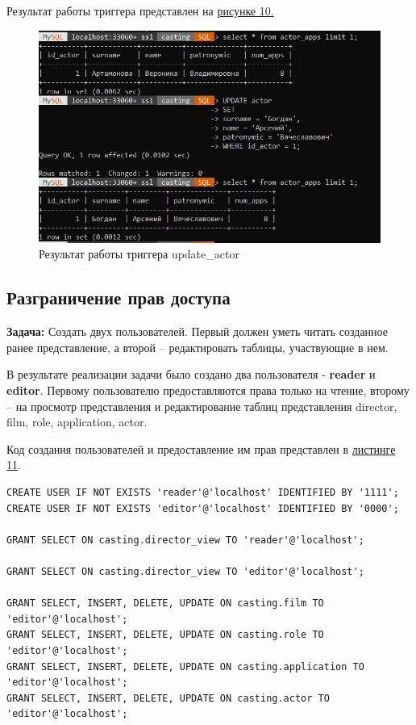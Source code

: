 \documentclass[11pt,a4paper,final]{article} %
\begin{document}
Результат работы триггера представлен на \hyperref[fig:pic10]{рисунке 10.}

\begin{figure}[H]
	\centering
	\includegraphics[width=0.9\linewidth]{pic10.png}
	\caption{Результат работы триггера update\_actor}
	\label{fig:pic10}
\end{figure}


\subsection{Разграничение прав доступа}

\textbf{Задача:} Создать двух пользователей. Первый должен уметь читать созданное ранее представление, а второй -- редактировать таблицы, участвующие в нем.

\par В результате реализации задачи было создано два пользователя - \textbf{reader} и \textbf{editor}. Первому пользователю предоставляются права только на чтение, второму -- на просмотр представления и редактирование таблиц представления director, film, role, application, actor.

Код создания пользователей и предоставление им прав представлен в \hyperref[lst:l11]{листинге 11}.

\begin{lstlisting}[caption={Код создания пользователей и назначения им прав}, label=lst:l11]
CREATE USER IF NOT EXISTS 'reader'@'localhost' IDENTIFIED BY '1111';
CREATE USER IF NOT EXISTS 'editor'@'localhost' IDENTIFIED BY '0000';

GRANT SELECT ON casting.director_view TO 'reader'@'localhost';

GRANT SELECT ON casting.director_view TO 'editor'@'localhost';

GRANT SELECT, INSERT, DELETE, UPDATE ON casting.film TO 'editor'@'localhost';
GRANT SELECT, INSERT, DELETE, UPDATE ON casting.role TO 'editor'@'localhost';
GRANT SELECT, INSERT, DELETE, UPDATE ON casting.application TO 'editor'@'localhost';
GRANT SELECT, INSERT, DELETE, UPDATE ON casting.actor TO 'editor'@'localhost';
\end{lstlisting}
\end{document}
